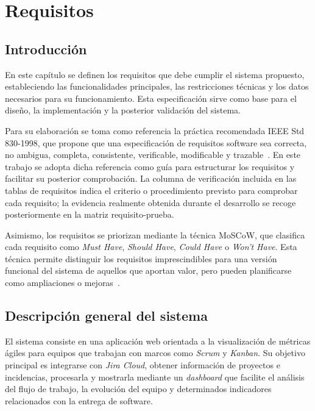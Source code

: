 \chapter{Requisitos}

\section{Introducción}

En este capítulo se definen los requisitos que debe cumplir el sistema propuesto, estableciendo las funcionalidades principales, las restricciones técnicas y los datos necesarios para su funcionamiento. Esta especificación sirve como base para el diseño, la implementación y la posterior validación del sistema.

Para su elaboración se toma como referencia la práctica recomendada IEEE Std 830-1998, que propone que una especificación de requisitos software sea correcta, no ambigua, completa, consistente, verificable, modificable y trazable~\cite{IEEE8301998}. En este trabajo se adopta dicha referencia como guía para estructurar los requisitos y facilitar su posterior comprobación. La columna de verificación incluida en las tablas de requisitos indica el criterio o procedimiento previsto para comprobar cada requisito; la evidencia realmente obtenida durante el desarrollo se recoge posteriormente en la matriz requisito-prueba.

Asimismo, los requisitos se priorizan mediante la técnica MoSCoW, que clasifica cada requisito como \textit{Must Have}, \textit{Should Have}, \textit{Could Have} o \textit{Won't Have}. Esta técnica permite distinguir los requisitos imprescindibles para una versión funcional del sistema de aquellos que aportan valor, pero pueden planificarse como ampliaciones o mejoras~\cite{AgileBusinessConsortiumMoSCoW}.

\section{Descripción general del sistema}

El sistema consiste en una aplicación web orientada a la visualización de métricas ágiles para equipos que trabajan con marcos como \textit{Scrum} y \textit{Kanban}. Su objetivo principal es integrarse con \textit{Jira Cloud}, obtener información de proyectos e incidencias, procesarla y mostrarla mediante un \textit{dashboard} que facilite el análisis del flujo de trabajo, la evolución del equipo y determinados indicadores relacionados con la entrega de software.


